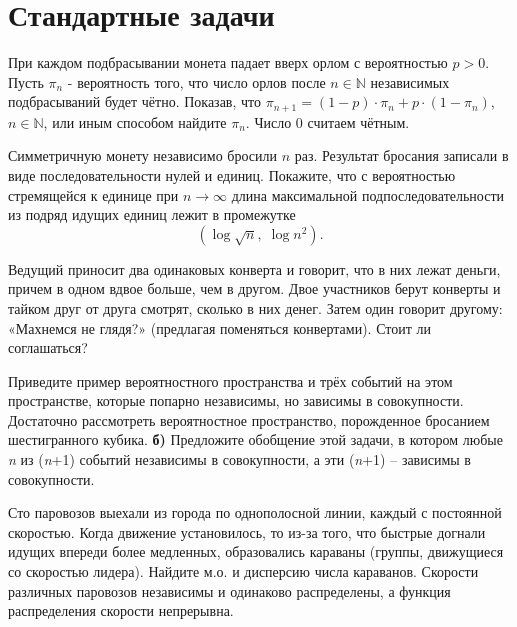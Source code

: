 \section{Стандартные задачи}

\begin{problem}
При каждом подбрасывании монета падает вверх орлом с вероятностью $p>0$. Пусть $\pi _{n} $ - вероятность того, что число орлов после $n\in {\mathbb N}$ независимых подбрасываний будет чётно. Показав, что $\pi _{n+1} =\left(1-p\right)\cdot \pi _{n} +p\cdot \left(1-\pi _{n} \right)$, $n\in {\mathbb N}$, или иным способом найдите $\pi _{n} $. Число $0$ считаем чётным.
\end{problem}

\begin{problem}
Симметричную монету независимо бросили $n$ раз. Результат бросания записали в виде последовательности нулей и единиц. Покажите, что с вероятностью стремящейся к единице при $n\to \infty $ длина максимальной подпоследовательности из подряд идущих единиц лежит в промежутке
\[\left(\log \sqrt{n} ,\; \log n^{2} \right).\] 
\end{problem}

\begin{problem}
Ведущий приносит два одинаковых конверта и говорит, что в них лежат деньги, причем в одном вдвое больше, чем в другом. Двое участников берут конверты и тайком друг от друга смотрят, сколько в них денег. Затем один говорит другому: «Махнемся не глядя?» (предлагая поменяться конвертами). Стоит ли соглашаться?
\end{problem}

\begin{problem}
Приведите пример вероятностного пространства и трёх событий на этом пространстве, которые попарно независимы, но зависимы в совокупности. Достаточно рассмотреть вероятностное пространство, порожденное бросанием шестигранного кубика. \textbf{б) }Предложите обобщение этой задачи, в котором любые \textit{n} из (\textit{n}+1) событий независимы в совокупности, а эти (\textit{n}+1) -- зависимы в совокупности.
\end{problem}

\begin{problem}
Сто паровозов выехали из города по однополосной линии, каждый с постоянной скоростью. Когда движение установилось, то из-за того, что быстрые догнали идущих впереди более медленных, образовались караваны (группы, движущиеся со скоростью лидера). Найдите м.о. и дисперсию числа караванов. Скорости различных паровозов независимы и одинаково распределены, а функция распределения скорости непрерывна.
\end{problem}

